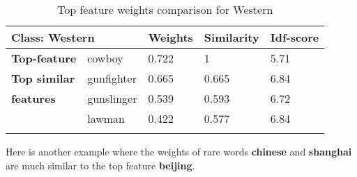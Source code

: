 \begin{table}[htbp]
\begin{tabular}{lllll}
\multicolumn{2}{l|}{\textbf{Class: Western}}                                  & \multicolumn{1}{l|}{\textbf{Weights}} & \multicolumn{1}{l|}{\textbf{Similarity}} & \textbf{Idf-score} \\ \hline
\multicolumn{1}{l|}{\textbf{Top-feature}} & \multicolumn{1}{l|}{cowboy}     & \multicolumn{1}{l|}{0.722}            & \multicolumn{1}{l|}{1}                   & 5.71               \\ \hline
\multicolumn{1}{l|}{\textbf{Top similar}} & \multicolumn{1}{l|}{gunfighter} & \multicolumn{1}{l|}{0.665}            & \multicolumn{1}{l|}{0.665}               & 6.84               \\
\multicolumn{1}{l|}{\textbf{features}}    & \multicolumn{1}{l|}{gunslinger} & \multicolumn{1}{l|}{0.539}            & \multicolumn{1}{l|}{0.593}               & 6.72               \\
\multicolumn{1}{l}{}                     & \multicolumn{1}{l|}{lawman}     & \multicolumn{1}{l|}{0.422}            & \multicolumn{1}{l|}{0.577}               & 6.84               \\
                                          &                                 &                                       &                                          &                   
\end{tabular}
\caption{\label{tab:widgets}Top feature weights comparison for Western}
\end{table}

\newpage
Here is another example where the weights of rare words \textbf{chinese} and \textbf{shanghai} are much similar to the top feature \textbf{beijing}.

